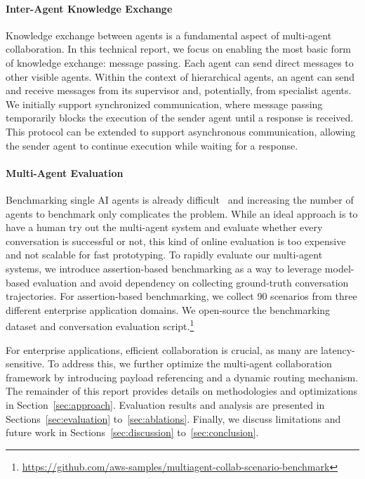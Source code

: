 \paragraph{Inter-Agent Knowledge Exchange} Knowledge exchange between agents is a fundamental aspect of multi-agent collaboration. In this technical report, we focus on enabling the most basic form of knowledge exchange: message passing. Each agent can send direct messages to other visible agents. Within the context of hierarchical agents, an agent can send and receive messages from its supervisor and, potentially, from specialist agents. We initially support synchronized communication, where message passing temporarily blocks the execution of the sender agent until a response is received. This protocol can be extended to support asynchronous communication, allowing the sender agent to continue execution while waiting for a response.

\paragraph{Multi-Agent Evaluation} Benchmarking single AI agents is already difficult~\cite{kapoor2024ai} and increasing the number of agents to benchmark only complicates the problem. While an ideal approach is to have a human try out the multi-agent system and evaluate whether every conversation is successful or not, this kind of online evaluation is too expensive and not scalable for fast prototyping. To rapidly evaluate our multi-agent systems, we introduce assertion-based benchmarking as a way to leverage model-based evaluation and avoid dependency on collecting ground-truth conversation trajectories. For assertion-based benchmarking, we collect 90 scenarios from three different enterprise application domains. We open-source the benchmarking dataset and conversation evaluation script.\footnote{\url{https://github.com/aws-samples/multiagent-collab-scenario-benchmark}}

For enterprise applications, efficient collaboration is crucial, as many are latency-sensitive. To address this, we further optimize the multi-agent collaboration framework by introducing payload referencing and a dynamic routing mechanism. The remainder of this report provides details on methodologies and optimizations in Section~\ref{sec:approach}. Evaluation results and analysis are presented in Sections~\ref{sec:evaluation} to~\ref{sec:ablations}. Finally, we discuss limitations and future work in Sections~\ref{sec:discussion} to~\ref{sec:conclusion}.